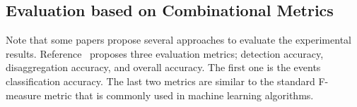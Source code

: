 
\subsection{Evaluation based on Combinational Metrics} 
Note that some papers propose several approaches to 
evaluate the experimental results.
Reference~\cite{liang2010load} proposes three evaluation metrics; 
detection accuracy, disaggregation accuracy, and
overall accuracy. 
The first one is the events classification accuracy.
The last two metrics are similar to the standard F-measure metric that is commonly used
in machine learning algorithms.

